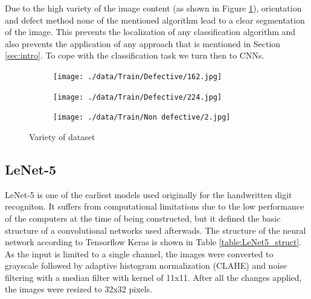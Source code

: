 \documentclass[10pt, final]{article}
\begin{document}
Due to the high variety of the image content (as shown in Figure \ref{fig:variety}),
orientation and defect method none of the mentioned algorithm lead to a clear segmentation of the image.
This prevents the localization of any classification algorithm and also prevents the application of any approach that
is mentioned in Section \ref{sec:intro}.
To cope with the classification task we turn then to CNNs.

\begin{figure}[!ht]
	\centering
	\begin{subfigure}{0.3\textwidth}
		\centering
		\texttt{[image: ./data/Train/Defective/162.jpg]}
	\end{subfigure}
	\begin{subfigure}{0.3\textwidth}
		\centering
		\texttt{[image: ./data/Train/Defective/224.jpg]}
	\end{subfigure}
	\begin{subfigure}{0.3\textwidth}
		\centering
		\texttt{[image: ./data/Train/Non defective/2.jpg]}
	\end{subfigure}
	\caption{Variety of dataset}
	\label{fig:variety}
\end{figure}

\subsection{LeNet-5} \label{sec:Lenet5}
LeNet-5 is one of the earliest models used originally for the handwritten digit recogniton.
It suffers from computational limitations due to the low performance of the computers at the time of being constructed,
but it defined the basic structure of a convolutional networks used afterwads.
The structure of the neural network according to Tensorflow Keras is shown in Table \ref{table:LeNet5_struct}.
As the input is limited to a single channel, the images were converted to grayscale followed by adaptive histogram
normalization (CLAHE) and noise filtering with a median filter with kernel of 11x11.
After all the changes applied, the images were resized to 32x32 pixels.
\end{document}
